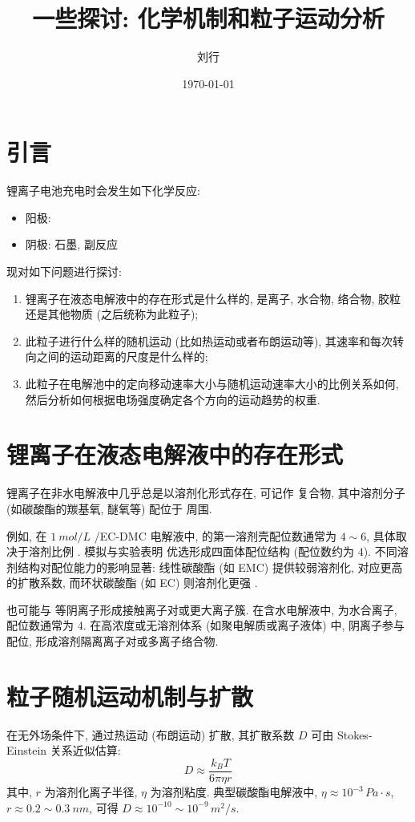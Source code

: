 \documentclass[12pt,a4paper]{article}
\title{一些探讨: 化学机制和粒子运动分析}
\author{刘行}
\date{\today}
\begin{document}
\maketitle
	\section*{引言}
		锂离子电池充电时会发生如下化学反应:
		\begin{itemize}
			\item 阳极: 
			\item 阴极: 石墨, 副反应 
		\end{itemize}

		现对如下问题进行探讨:
		\begin{enumerate}
			\item 锂离子在液态电解液中的存在形式是什么样的, 是离子, 水合物, 络合物, 胶粒还是其他物质 (之后统称为此粒子);
			\item 此粒子进行什么样的随机运动 (比如热运动或者布朗运动等), 其速率和每次转向之间的运动距离的尺度是什么样的;
			\item 此粒子在电解池中的定向移动速率大小与随机运动速率大小的比例关系如何, 然后分析如何根据电场强度确定各个方向的运动趋势的权重.
		\end{enumerate}

	\section{锂离子在液态电解液中的存在形式}
		锂离子在非水电解液中几乎总是以溶剂化形式存在, 可记作  复合物, 其中溶剂分子 (如碳酸酯的羰基氧, 醚氧等) 配位于  周围.

		例如, 在 $\SI{1}{mol/L}$  /EC-DMC 电解液中,  的第一溶剂壳配位数通常为 $4 \sim 6$, 具体取决于溶剂比例 \cite{ref1}. 模拟与实验表明  优选形成四面体配位结构 (配位数约为 $4$). 不同溶剂结构对配位能力的影响显著: 线性碳酸酯 (如 EMC) 提供较弱溶剂化, 对应更高的扩散系数, 而环状碳酸酯 (如 EC) 则溶剂化更强 \cite{ref2}.

		 也可能与  等阴离子形成接触离子对或更大离子簇. 在含水电解液中,  为水合离子, 配位数通常为 $4$. 在高浓度或无溶剂体系 (如聚电解质或离子液体) 中, 阴离子参与配位, 形成溶剂隔离离子对或多离子络合物\cite{ref1, ref3}.

	\section{粒子随机运动机制与扩散}
		在无外场条件下,  通过热运动 (布朗运动) 扩散, 其扩散系数 $D$ 可由 Stokes-Einstein 关系近似估算:
		\begin{equation}
		D \approx \frac{k_{B} T}{6 \pi \eta r}
		\end{equation}
		其中, $r$ 为溶剂化离子半径, $\eta$ 为溶剂粘度. 典型碳酸酯电解液中, $\eta \approx 10^{-3}\,\si{Pa\cdot s}$, $r \approx 0.2 \sim \SI{0.3}{nm}$, 可得 $D \approx 10^{-10} \sim 10^{-9}\,\si{m^{2}/s}$.
\end{document}
